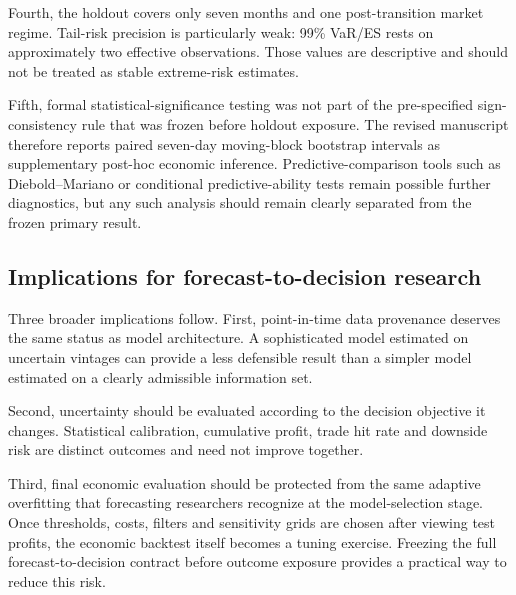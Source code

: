 Fourth, the holdout covers only seven months and one post-transition market regime. Tail-risk precision is particularly weak: 99\% VaR/ES rests on approximately two effective observations. Those values are descriptive and should not be treated as stable extreme-risk estimates.

Fifth, formal statistical-significance testing was not part of the pre-specified sign-consistency rule that was frozen before holdout exposure. The revised manuscript therefore reports paired seven-day moving-block bootstrap intervals as supplementary post-hoc economic inference. Predictive-comparison tools such as Diebold--Mariano or conditional predictive-ability tests \citep{diebold1995,giacomini2006} remain possible further diagnostics, but any such analysis should remain clearly separated from the frozen primary result.

\subsection{Implications for forecast-to-decision research}

Three broader implications follow. First, point-in-time data provenance deserves the same status as model architecture. A sophisticated model estimated on uncertain vintages can provide a less defensible result than a simpler model estimated on a clearly admissible information set.

Second, uncertainty should be evaluated according to the decision objective it changes. Statistical calibration, cumulative profit, trade hit rate and downside risk are distinct outcomes and need not improve together.

Third, final economic evaluation should be protected from the same adaptive overfitting that forecasting researchers recognize at the model-selection stage. Once thresholds, costs, filters and sensitivity grids are chosen after viewing test profits, the economic backtest itself becomes a tuning exercise. Freezing the full forecast-to-decision contract before outcome exposure provides a practical way to reduce this risk.
